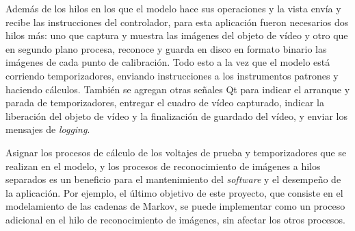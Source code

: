 Además de los hilos en los que el modelo hace sus operaciones y la vista envía y recibe las instrucciones del controlador, para esta aplicación fueron necesarios dos hilos más: uno que captura y muestra las imágenes del objeto de vídeo y otro que en segundo plano procesa, reconoce y guarda en disco en formato binario las imágenes de cada punto de calibración.
Todo esto a la vez que el modelo está corriendo temporizadores, enviando instrucciones a los instrumentos patrones y haciendo cálculos.
También se agregan otras señales Qt para indicar el arranque y parada de temporizadores, entregar el cuadro de vídeo capturado, indicar la liberación del objeto de vídeo y la finalización de guardado del vídeo, y enviar los mensajes de \emph{logging}.

Asignar los procesos de cálculo de los voltajes de prueba y temporizadores que se realizan en el modelo, y los procesos de reconocimiento de imágenes a hilos separados es un beneficio para el mantenimiento del \emph{software} y el desempeño de la aplicación.
Por ejemplo, el último objetivo de este proyecto, que consiste en el modelamiento de las cadenas de Markov, se puede implementar como un proceso adicional en el hilo de reconocimiento de imágenes, sin afectar los otros procesos.

\vfill

